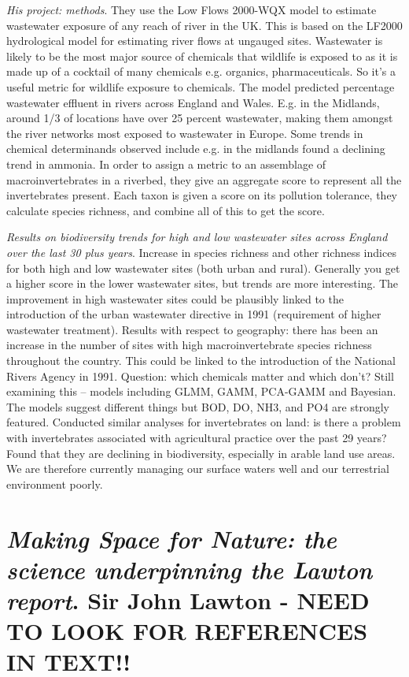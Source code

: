 \documentclass[9pt]{article}
\begin{document}
	\textit{His project: methods}. They use the Low Flows 2000-WQX model to estimate wastewater exposure of any reach of river in the UK. This is based on the LF2000 hydrological model for estimating river flows at ungauged sites. Wastewater is likely to be the most major source of chemicals that wildlife is exposed to as it is made up of a cocktail of many chemicals e.g. organics, pharmaceuticals. So it’s a useful metric for wildlife exposure to chemicals. The model predicted percentage wastewater effluent in rivers across England and Wales. E.g. in the Midlands, around 1/3 of locations have over 25 percent wastewater, making them amongst the river networks most exposed to wastewater in Europe. Some trends in chemical determinands observed include e.g. in the midlands found a declining trend in ammonia. In order to assign a metric to an assemblage of macroinvertebrates in a riverbed, they give an aggregate score to represent all the invertebrates present. Each taxon is given a score on its pollution tolerance, they calculate species richness, and combine all of this to get the score. 
	
	\textit{Results on biodiversity trends for high and low wastewater sites across England over the last 30 plus years}. Increase in species richness and other richness indices for both high and low wastewater sites (both urban and rural). Generally you get a higher score in the lower wastewater sites, but trends are more interesting. The improvement in high wastewater sites could be plausibly linked to the introduction of the urban wastewater directive in 1991 (requirement of higher wastewater treatment). Results with respect to geography: there has been an increase in the number of sites with high macroinvertebrate species richness throughout the country. This could be linked to the introduction of the National Rivers Agency in 1991. Question: which chemicals matter and which don’t? Still examining this – models including GLMM, GAMM, PCA-GAMM and Bayesian. The models suggest different things but BOD, DO, NH3, and PO4 are strongly featured. Conducted similar analyses for invertebrates on land: is there a problem with invertebrates associated with agricultural practice over the past 29 years? Found that they are declining in biodiversity, especially in arable land use areas. We are therefore currently managing our surface waters well and our terrestrial environment poorly. 
	
	
	\section{\textit{Making Space for Nature: the science underpinning the Lawton report}. Sir John Lawton - NEED TO LOOK FOR REFERENCES IN TEXT!!}
	
\end{document}
